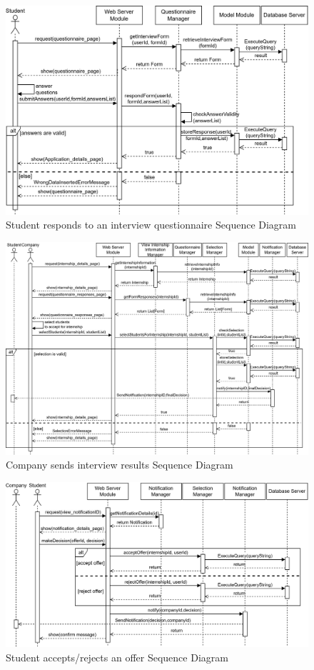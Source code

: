 \begin{figure}[H]
    \centering
    \includegraphics[width=1\textwidth]{Images/Runtime_view/respondQuest_SD.png}
    \caption{Student responds to an interview questionnaire Sequence Diagram}
\end{figure}
\begin{figure}[H]
    \centering
    \includegraphics[width=1\textwidth]{Images/Runtime_view/intResults_SD.png}
    \caption{Company sends interview results Sequence Diagram}
\end{figure}
\begin{figure}[H]
    \centering
    \includegraphics[width=1\textwidth]{Images/Runtime_view/acceptRej_SD.png}
    \caption{Student accepts/rejects an offer Sequence Diagram}
\end{figure}
